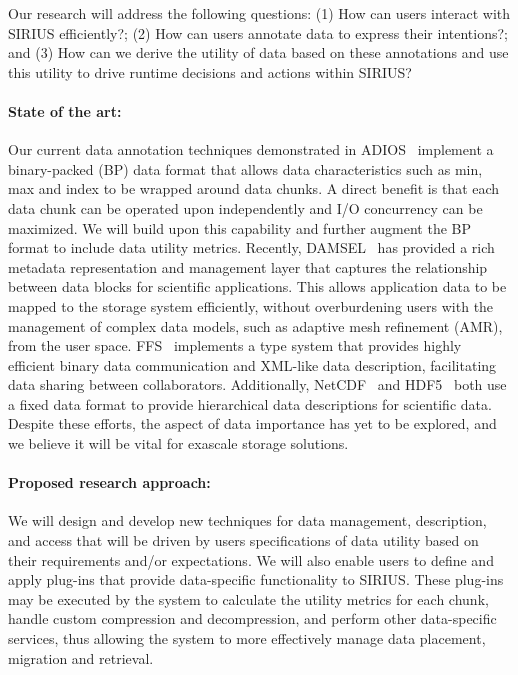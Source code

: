

Our research will address the following questions:
(1) How can users interact with SIRIUS  efficiently?;
(2) How can users annotate data to express their intentions?; and
(3) How can we derive the utility of data based on these annotations and use this utility to drive runtime decisions and actions within SIRIUS?

\paragraph{State of the art:}
Our current data annotation techniques demonstrated in
ADIOS~\cite{lofstead:2009:adaptible} implement a binary-packed (BP) data format that
allows data characteristics such as min, max and index to be wrapped around
data chunks. A direct benefit is that each data chunk can be operated upon
independently and I/O concurrency can be maximized. We will build upon this
capability and further augment the BP format to include data utility metrics.
Recently,
DAMSEL~\cite{damsel} has provided a rich metadata representation and management
layer that captures the relationship between data blocks for scientific
applications.  This allows application data to be mapped to the storage system
efficiently, without overburdening users with the management of complex data models, such
as adaptive mesh refinement (AMR), from the user space. 
FFS~\cite{ffs} implements a type system that provides highly efficient binary
data communication and XML-like data description, facilitating data sharing
between collaborators. Additionally, NetCDF~\cite{netcdf} and HDF5~\cite{hdf5}
both use a fixed data format to provide hierarchical data descriptions for scientific data.
Despite these efforts, the aspect of data importance has yet to be 
explored, and we believe it will be vital for exascale storage solutions.

\paragraph{Proposed research approach:} 
We will design and develop new techniques for data management, description,
and access that will be driven by users specifications of data utility based on their requirements and/or
expectations. We will also enable users to define and apply plug-ins that
provide data-specific functionality to SIRIUS.
These plug-ins may be executed by the system to
calculate the utility metrics for each chunk, handle custom compression
and decompression, and perform other data-specific services, thus allowing
the system to more effectively manage data placement, migration and retrieval.
%

